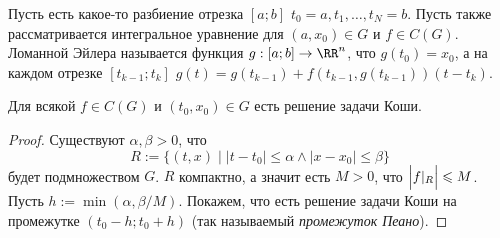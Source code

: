 \documentclass[12pt,a4paper]{article}
\begin{document}
    \begin{definition}
        Пусть есть какое-то разбиение отрезка $[a; b]$ $t_0 = a, t_1, \dots, t_N = b$. Пусть также рассматривается интегральное уравнение для $(a, x_0) \in G$ и $f \in C(G)$. Ломанной Эйлера называется функция $g: [a; b] \to \RR^n$, что $g(t_0) = x_0$, а на каждом отрезке $[t_{k-1}; t_k]$ $g(t) = g(t_{k-1}) + f(t_{k-1}, g(t_{k-1})) (t - t_k)$.
    \end{definition}

    

    \begin{theorem}[Пеано]
        Для всякой $f \in C(G)$ и $(t_0, x_0) \in G$ есть решение задачи Коши.
    \end{theorem}

    \begin{proof}
        Существуют $\alpha, \beta > 0$, что
        \[R := \{(t, x) \mid |t - t_0| \leqslant \alpha \wedge |x - x_0| \leqslant \beta\}\]
        будет подмножеством $G$. $R$ компактно, а значит есть $M > 0$, что $\Bigl|f|_R\Bigr| \leqslant M$. Пусть $h := \min(\alpha, \beta/M)$. Покажем, что есть решение задачи Коши на промежутке $(t_0 - h; t_0 + h)$ (так называемый \emph{промежуток Пеано}).
    \end{proof}
\end{document}
